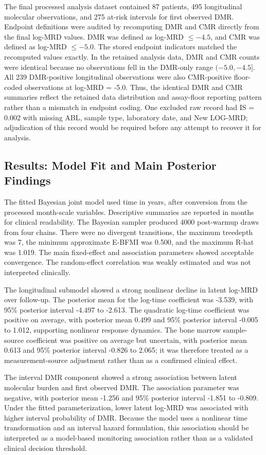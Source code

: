 The final processed analysis dataset contained 87 patients, 495 longitudinal molecular observations, and 275 at-risk intervals for first observed DMR. Endpoint definitions were audited by recomputing DMR and CMR directly from the final log-MRD values. DMR was defined as log-MRD \(\leq -4.5\), and CMR was defined as log-MRD \(\leq -5.0\). The stored endpoint indicators matched the recomputed values exactly. In the retained analysis data, DMR and CMR counts were identical because no observations fell in the DMR-only range \((-5.0,-4.5]\). All 239 DMR-positive longitudinal observations were also CMR-positive floor-coded observations at log-MRD = -5.0. Thus, the identical DMR and CMR summaries reflect the retained data distribution and assay-floor reporting pattern rather than a mismatch in endpoint coding. One excluded raw record had IS = 0.002 with missing ABL, sample type, laboratory date, and New LOG-MRD; adjudication of this record would be required before any attempt to recover it for analysis.

\subsection*{Results: Model Fit and Main Posterior Findings}

The fitted Bayesian joint model used time in years, after conversion from the processed month-scale variables. Descriptive summaries are reported in months for clinical readability. The Bayesian sampler produced 4000 post-warmup draws from four chains. There were no divergent transitions, the maximum treedepth was 7, the minimum approximate E-BFMI was 0.500, and the maximum R-hat was 1.019. The main fixed-effect and association parameters showed acceptable convergence. The random-effect correlation was weakly estimated and was not interpreted clinically.

The longitudinal submodel showed a strong nonlinear decline in latent log-MRD over follow-up. The posterior mean for the log-time coefficient was -3.539, with 95\% posterior interval -4.497 to -2.613. The quadratic log-time coefficient was positive on average, with posterior mean 0.499 and 95\% posterior interval -0.005 to 1.012, supporting nonlinear response dynamics. The bone marrow sample-source coefficient was positive on average but uncertain, with posterior mean 0.613 and 95\% posterior interval -0.826 to 2.065; it was therefore treated as a measurement-source adjustment rather than as a confirmed clinical effect.

The interval DMR component showed a strong association between latent molecular burden and first observed DMR. The association parameter was negative, with posterior mean -1.256 and 95\% posterior interval -1.851 to -0.809. Under the fitted parameterization, lower latent log-MRD was associated with higher interval probability of DMR. Because the model uses a nonlinear time transformation and an interval hazard formulation, this association should be interpreted as a model-based monitoring association rather than as a validated clinical decision threshold.

